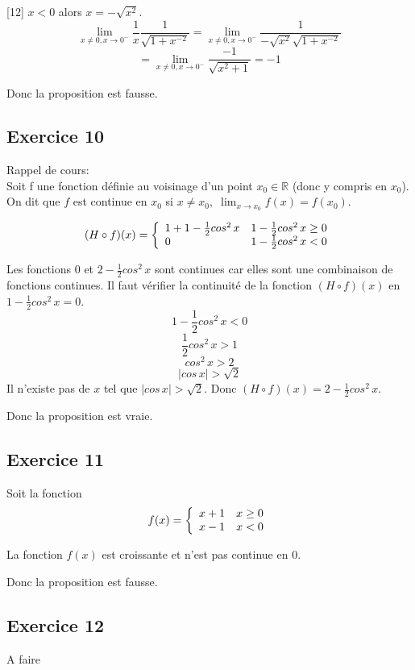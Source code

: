 \documentclass[]{book}
\theoremstyle{definition}
\newcommand{\bb}[1]{\mathbb{#1}}
\newcommand{\R}{\bb{R}}
\begin{document}
[12] $x<0$ alors $x = -\sqrt{x^2}$.
$$ \lim_{x \neq 0, x \to 0^{-}} \frac{1}{x} \frac{1}{\sqrt{1+x^{-2}}} = \lim_{x \neq 0, x \to 0^{-}} \frac{1}{-\sqrt{x^2}\sqrt{1+x^{-2}}}$$
$$ = \lim_{x \neq 0, x \to 0^{-}} \frac{-1}{\sqrt{x^2+1}} = -1$$



Donc la proposition est fausse.


\subsection*{Exercice 10}
Rappel de cours:\\
Soit f une fonction d\'efinie au voisinage d'un point $x_0 \in \R$ (donc y compris en
$x_0$). On dit que $f$ est continue en $x_0$ si $x \ne x_0,\;\lim_{x \to x_0} f(x) = f(x_0)$.


$$(H \circ f) (x) = 
\left\{ 
\begin{array}{l l}
 1 + 1 -\frac{1}{2}cos^2\, x & 1 -\frac{1}{2}cos^2\, x \ge 0\\
 0 & 1 -\frac{1}{2}cos^2\, x < 0\\
\end{array}
\right. 
$$

Les fonctions $0$ et $2 -\frac{1}{2}cos^2\, x$ sont continues car elles sont une combinaison de fonctions continues. Il faut v\'erifier la continuit\'e de la fonction $(H \circ f) (x)$ en $1 -\frac{1}{2}cos^2\, x = 0$.
$$1 -\frac{1}{2}cos^2\, x < 0$$
$$\frac{1}{2}cos^2\, x > 1$$
$$cos^2\, x > 2$$
$$|cos\, x| > \sqrt{2}$$
Il n'existe pas de $x$ tel que $|cos\, x| > \sqrt{2}$. Donc $(H \circ f) (x) = 2 -\frac{1}{2}cos^2\, x$.


Donc la proposition est vraie.

\subsection*{Exercice 11}
Soit la fonction 
$$f(x) = 
\left\{ 
\begin{array}{l l}
 x+1 & x \ge 0\\
 x-1 & x < 0\\
\end{array}
\right. 
$$

La fonction $f(x)$ est croissante et n'est pas continue en 0.


Donc la proposition est fausse.

\subsection*{Exercice 12}
A faire
\end{document}
